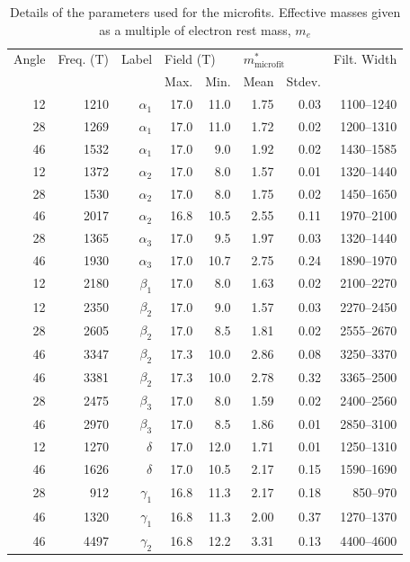 \begin{table}
    \begin{center}
        \caption{Details of the parameters used for the microfits. Effective masses given as a multiple of electron rest mass, $m_e$}
        \begin{tabular}[!h]{rrrrrrrr}
\toprule
Angle	& Freq. (\unit{T})	& Label	 & \multicolumn{2}{l}{Field (\unit[]{T})}  & \multicolumn{2}{l}{$m^*_{\textrm{microfit}}$}  & Filt. Width\\
        &                   &       & Max. & Min. & Mean & Stdev.   &   \\
\midrule
12	& 1210	& $\alpha_1$	& 17.0	& 11.0	& 1.75	& 0.03 &	1100--1240\\
28	& 1269	& $\alpha_1$	& 17.0	& 11.0	& 1.72	& 0.02 &	1200--1310\\
46	& 1532	& $\alpha_1$	& 17.0	& 9.0	& 1.92	& 0.02 &	1430--1585\\
12	& 1372	& $\alpha_2$	& 17.0	& 8.0	& 1.57	& 0.01 &	1320--1440\\
28	& 1530	& $\alpha_2$	& 17.0	& 8.0	& 1.75	& 0.02 &	1450--1650\\
46	& 2017	& $\alpha_2$	& 16.8	& 10.5	& 2.55	& 0.11 &	1970--2100\\
28	& 1365	& $\alpha_3$	& 17.0	& 9.5	& 1.97	& 0.03 &	1320--1440\\
46	& 1930	& $\alpha_3$	& 17.0	& 10.7	& 2.75	& 0.24 &	1890--1970\\
12	& 2180	& $\beta_1$	& 17.0	& 8.0	& 1.63	& 0.02 &	2100--2270\\
12	& 2350	& $\beta_2$	& 17.0	& 9.0	& 1.57	& 0.03 &	2270--2450\\
28	& 2605	& $\beta_2$	& 17.0	& 8.5	& 1.81	& 0.02 &	2555--2670\\
46	& 3347	& $\beta_2$	& 17.3	& 10.0	& 2.86	& 0.08 &	3250--3370\\
46	& 3381	& $\beta_2$	& 17.3	& 10.0	& 2.78	& 0.32 &	3365--2500\\
28	& 2475	& $\beta_3$	& 17.0	& 8.0	& 1.59	& 0.02 &	2400--2560\\
46	& 2970	& $\beta_3$	& 17.0	& 8.5	& 1.86	& 0.01 &	2850--3100\\
12	& 1270	& $\delta$	& 17.0	& 12.0	& 1.71	& 0.01 &	1250--1310\\
46	& 1626	& $\delta$	& 17.0	& 10.5	& 2.17	& 0.15 &	1590--1690\\
28	& 912	& $\gamma_1$	& 16.8	& 11.3	& 2.17	& 0.18 &	850--970  \\
46	& 1320	& $\gamma_1$	& 16.8	& 11.3	& 2.00	& 0.37 &	1270--1370\\
46	& 4497	& $\gamma_2$	& 16.8	& 12.2	& 3.31	& 0.13 &	4400--4600\\
\bottomrule
        \end{tabular}
        \label{Table:3:MicroFitResults}
    \end{center}
\end{table}

